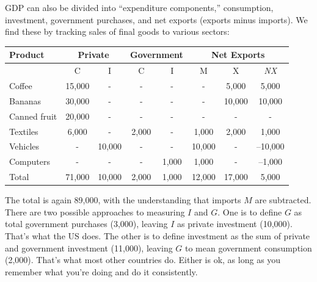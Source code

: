 \documentclass[letterpaper,12pt]{article}
\newcommand{\phm}{\phantom{--}}
\newcommand{\NX}{\mbox{\it NX\/}}
\begin{document}
\begin{enumerate}
GDP can also be divided into ``expenditure components,''
consumption, investment, government purchases, and net exports
(exports minus imports). We
find these by tracking sales of final goods to various sectors:
\begin{center}
\begin{tabular}{lccccccc}
\hline\hline
Product       & \multicolumn{2}{c}{Private}     & \multicolumn{2}{c}{Government}    & \multicolumn{3}{c}{Net Exports}     \\%
\hline%
              &       C              & I         & C                 & I               & M          & X      & \NX     \\%
\hline\hline%
Coffee        &     15,000           & -         & -                 &    -            & -          & 5,000  & 5,000    \\%
\cline{1-8}%
Bananas       &     30,000           & -         & -                 &    -            & -          & 10,000 & 10,000     \\%
\cline{1-8}%
Canned fruit  &     20,000           & -         & -                 &    -            & -          & -      & -     \\%
\cline{1-8}%
Textiles      &      6,000           & -         & 2,000             &    -            & 1,000      & 2,000  & 1,000      \\%
\cline{1-8}%
Vehicles      &        -             & 10,000    & -                 &    -            & 10,000     & -      & --10,000\phm      \\%
\cline{1-8}%
Computers     &        -             & -         & -                 &   1,000         & 1,000      & -      & --1,000      \\%
\hline\hline%
Total         &     71,000           & 10,000    & 2,000 &   1,000 &
12,000     & 17,000 & 5,000 \\
\hline\hline%
\end{tabular}
\end{center}
The total is again 89,000, with the understanding that imports $M$
are subtracted.  There are two possible approaches to measuring $I$
and $G$.  One is to define $G$ as total government purchases
(3,000), leaving $I$ as private investment (10,000).  
That's what the US does.  
The other is to define investment as the sum of private and government investment
(11,000), leaving $G$ to mean government consumption (2,000). 
That's what most other countries do.  
Either is ok, as long as you remember what you're doing
and do it consistently.  


\end{enumerate}
\end{document}

